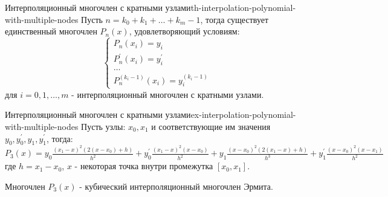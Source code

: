 \documentclass[14pt]{extarticle}
\begin{document}
    \begin{definition}{Интерполяционный многочлен с кратными узлами}{th-interpolation-polynomial-with-multiple-nodes}
        Пусть $n = k_{0} + k_{1} + \ldots + k_{m} - 1$, тогда существует единственный многочлен $P_{n}(x)$, удовлетворяющий условиям:
        $$
        \begin{cases}
            P_{n}(x_{i}) = y_{i}\\
            P_{n}^{'}(x_{i}) = y_{i}^{'}\\
            \ldots\\
            P_{n}^{(k_{i} - 1)}(x_{i}) = y_{i}^{(k_{i} - 1)}
        \end{cases}
        $$
        для $i = 0, 1, \ldots, m$ - интерполяционный многочлен с кратными узлами.
    \end{definition}

    \begin{example}{Интерполяционный многочлен с кратными узлами}{ex-interpolation-polynomial-with-multiple-nodes}
        Пусть узлы: $x_{0}, x_{1}$ и соответствующие им значения $y_{0}, y_{0}^{'}, y_{1}, y_{1}^{'}$, тогда:\\
        $P_{3}(x) = y_{0}\frac{(x_{1} - x)^{2}(2(x - x_{0}) + h)}{h^{2}} + y_{0}^{'}\frac{(x_{1} - x)^{2}(x - x_{0})}{h^{2}} + y_{1}\frac{(x - x_{0})^{2}(2(x_{1} - x)+h)}{h^{3}} + y_{1}^{'}\frac{(x - x_{0})^{2}(x-x_{1})}{h^{2}}$\\
        где $h = x_{1} - x_{0}$, $x$ - некоторая точка внутри промежутка $[x_{0}, x_{1}]$.

        \vspace{\baselineskip}

        Многочлен $P_{3}(x)$ - кубический интерполяционный многочлен Эрмита.
    \end{example}
\end{document}
